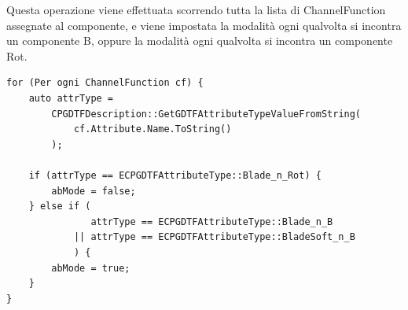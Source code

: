\documentclass[main.tex]{subfiles}
\begin{document}
Questa operazione viene effettuata scorrendo tutta la lista di ChannelFunction assegnate al componente, e viene impostata la modalità  ogni qualvolta si incontra un componente B, oppure la modalità  ogni qualvolta si incontra un componente Rot.
\begin{lstlisting}
for (Per ogni ChannelFunction cf) {
    auto attrType =
        CPGDTFDescription::GetGDTFAttributeTypeValueFromString(
            cf.Attribute.Name.ToString()
        );

    if (attrType == ECPGDTFAttributeType::Blade_n_Rot) {
        abMode = false;
    } else if (
               attrType == ECPGDTFAttributeType::Blade_n_B
            || attrType == ECPGDTFAttributeType::BladeSoft_n_B
            ) {
        abMode = true;
    }
}
\end{lstlisting}
\end{document}
